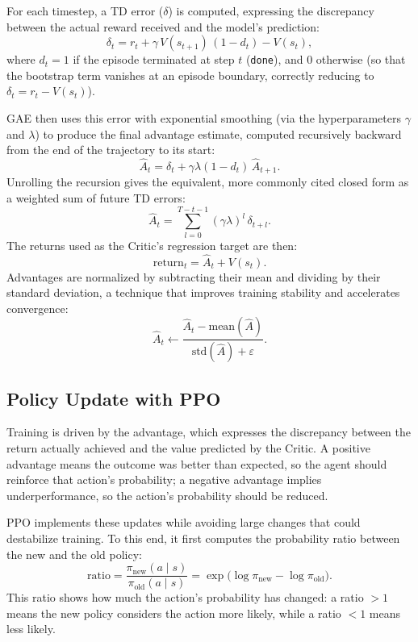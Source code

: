 \documentclass[11pt]{article}
\begin{document}
For each timestep, a TD error (\(\delta\)) is computed, expressing the discrepancy between the actual
reward received and the model's prediction:
\begin{equation}
\delta_t = r_t + \gamma\, V(s_{t+1})\,(1-d_t) - V(s_t),
\end{equation}
where $d_t = 1$ if the episode terminated at step $t$ (\texttt{done}), and $0$ otherwise (so that the
bootstrap term vanishes at an episode boundary, correctly reducing to $\delta_t = r_t - V(s_t)$).

GAE then uses this error with exponential smoothing (via the hyperparameters $\gamma$ and $\lambda$) to
produce the final advantage estimate, computed recursively backward from the end of the trajectory to its
start:
\begin{equation}
\hat{A}_t = \delta_t + \gamma\lambda(1-d_t)\,\hat{A}_{t+1}.
\end{equation}
Unrolling the recursion gives the equivalent, more commonly cited closed form as a weighted sum of future
TD errors:
\begin{equation}
\hat{A}_t = \sum_{l=0}^{T-t-1} (\gamma\lambda)^{l}\,\delta_{t+l}.
\end{equation}
The returns used as the Critic's regression target are then:
\begin{equation}
\text{return}_t = \hat{A}_t + V(s_t).
\end{equation}
Advantages are normalized by subtracting their mean and dividing by their standard deviation, a technique
that improves training stability and accelerates convergence:
\begin{equation}
\hat{A}_t \leftarrow \frac{\hat{A}_t - \text{mean}(\hat{A})}{\text{std}(\hat{A}) + \varepsilon}.
\end{equation}

\subsection{Policy Update with PPO}

Training is driven by the advantage, which expresses the discrepancy between the return actually achieved
and the value predicted by the Critic. A positive advantage means the outcome was better than expected,
so the agent should reinforce that action's probability; a negative advantage implies underperformance,
so the action's probability should be reduced.

PPO implements these updates while avoiding large changes that could destabilize training. To this end,
it first computes the probability ratio between the new and the old policy:
\begin{equation}
\text{ratio} = \frac{\pi_{\text{new}}(a\mid s)}{\pi_{\text{old}}(a\mid s)} = \exp\bigl(\log\pi_{\text{new}} - \log\pi_{\text{old}}\bigr).
\end{equation}
This ratio shows how much the action's probability has changed: a ratio $>1$ means the new policy
considers the action more likely, while a ratio $<1$ means less likely.
\end{document}
